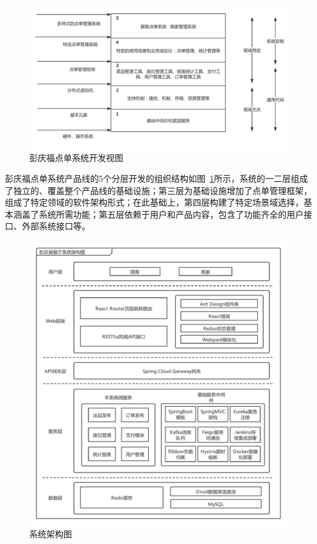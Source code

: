 \begin{figure}[htbp!]
  \centering
  \includegraphics[width=5in]{FIGs/chapter3/develop.pdf}
  \caption{彭庆福点单系统开发视图}\label{fig_developCH3}
\end{figure}

彭庆福点单系统产品线的5个分层开发的组织结构如图~\ref{fig_developCH3}所示，系统的一二层组成了独立的、覆盖整个产品线的基础设施；第三层为基础设施增加了点单管理框架，组成了特定领域的软件架构形式；在此基础上，第四层构建了特定场景域选择，基本涵盖了系统所需功能；第五层依赖于用户和产品内容，包含了功能齐全的用户接口、外部系统接口等。

\begin{figure}[htb]
  \centering
  \includegraphics[width=5in]{FIGs/chapter3/all.pdf}
  \caption{系统架构图}\label{fig_allCH3}
\end{figure}


